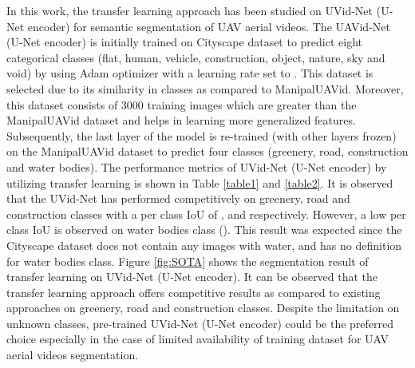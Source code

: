 \documentclass[journal]{IEEEtran}
\begin{document}
  
\par In this work, the transfer learning approach has been studied on UVid-Net (U-Net encoder) for semantic segmentation of UAV aerial videos. The UAVid-Net (U-Net encoder) is initially trained on Cityscape \cite{cordts2016cityscapes} dataset to predict eight categorical classes (flat, human, vehicle, construction, object, nature, sky and void) by using Adam optimizer with a learning rate set to . This dataset is selected due to its similarity in classes as compared to ManipalUAVid. Moreover, this dataset consists of 3000 training images which are greater than the ManipalUAVid dataset and helps in learning more generalized features. Subsequently, the last layer of the model is re-trained (with other layers frozen) on the ManipalUAVid dataset to predict four classes (greenery, road, construction and water bodies).  The performance metrics of UVid-Net (U-Net encoder) by utilizing transfer learning is shown in Table \ref{table1} and \ref{table2}. It is observed that the UVid-Net has performed competitively on greenery, road and construction classes with a per class IoU of ,  and  respectively. However, a low per class IoU is observed on water bodies class (). This result was expected since the Cityscape dataset does not contain any images with water, and has no definition for water bodies class.  Figure \ref{fig:SOTA} shows the segmentation result of transfer learning on UVid-Net (U-Net encoder). It can be observed that the transfer learning approach offers competitive results as compared to existing approaches on greenery, road and construction classes.  Despite the limitation on unknown classes, pre-trained UVid-Net (U-Net encoder) could be the preferred choice especially in the case of limited availability of training dataset for UAV aerial videos segmentation.

 
\end{document}
